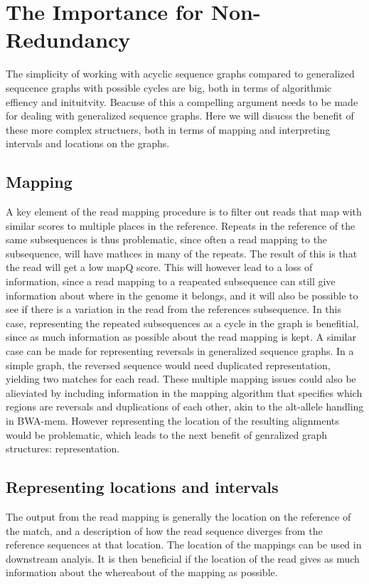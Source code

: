   \section{The Importance for Non-Redundancy}
The simplicity of working with acyclic sequence graphs compared to generalized sequcence graphs with possible cycles are big, both in terms of algorithmic effiency and inituitvity. Beacuse of this a compelling argument needs to be made for dealing with generalized sequence graphs. Here we will disucss the benefit of these more complex structuers, both in terms of mapping and interpreting intervals and locations on the graphs. 
\subsection{Mapping}
  A key element of the read mapping procedure is to filter out reads that map with similar scores to multiple places in the reference.
  Repeats in the reference of the same subsequences is thus problematic, since often a read mapping to the subsequence, will have mathces in many of the repeats.
  The result of this is that the read will get a low mapQ score.
  This will however lead to a loss of information, since a read mapping to a reapeated subsequence can still give information about where in the genome it belongs, and it will also be possible to see if there is a variation in the read from the references subsequence. 
  In this case, representing the repeated subsequences as a cycle in the graph is benefitial, since as much information as possible about the read mapping is kept.
  A similar case can be made for representing reversals in generalized sequence graphs.
  In a simple graph, the reversed sequence would need duplicated representation, yielding two matches for each read.
  These multiple mapping issues could also be alieviated by including information in the mapping algorithm that specifies which regions are reversals and duplications of each other, akin to the alt-allele handling in BWA-mem. However representing the location of the resulting alignments would be problematic, which leads to the next benefit of genralized graph structures: representation.
  \subsection{Representing locations and intervals}
  The output from the read mapping is generally the location on the reference of the match, and a description of how the read sequence diverges from the reference sequences at that location.
  The location of the mappings can be used in downstream analyis. It is then beneficial if the location of the read gives as much information about the whereabout of the mapping as possible. 


